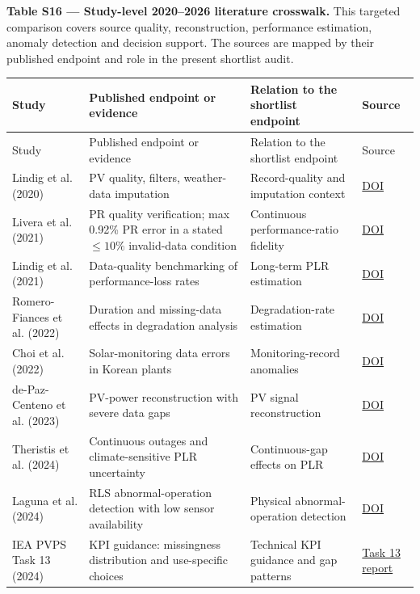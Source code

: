 \documentclass[11pt]{article}
\begin{document}
\medskip
\noindent\textbf{Table S16 --- Study-level 2020--2026 literature crosswalk.} This targeted comparison covers source quality, reconstruction, performance estimation, anomaly detection and decision support. The sources are mapped by their published endpoint and role in the present shortlist audit.
\begingroup
\scriptsize
\setlength{\tabcolsep}{3pt}
\renewcommand{\arraystretch}{1.14}
\begin{longtable}{L{2.75cm}L{4.6cm}L{6.3cm}L{1.2cm}}
\toprule
Study & Published endpoint or evidence & Relation to the shortlist endpoint & Source \\
\midrule
\endfirsthead
\toprule
Study & Published endpoint or evidence & Relation to the shortlist endpoint & Source \\
\midrule
\endhead
\bottomrule
\endfoot
Lindig et al. (2020) & PV quality, filters, weather-data imputation & Record-quality and imputation context & \href{https://doi.org/10.3390/en13195099}{DOI} \\
Livera et al. (2021) & PR quality verification; max 0.92\% PR error in a stated \ensuremath{\leq 10\%} invalid-data condition & Continuous performance-ratio fidelity & \href{https://doi.org/10.1002/pip.3349}{DOI} \\
Lindig et al. (2021) & Data-quality benchmarking of performance-loss rates & Long-term PLR estimation & \href{https://doi.org/10.1002/pip.3397}{DOI} \\
Romero-Fiances et al. (2022) & Duration and missing-data effects in degradation analysis & Degradation-rate estimation & \href{https://doi.org/10.1016/j.renene.2021.09.078}{DOI} \\
Choi et al. (2022) & Solar-monitoring data errors in Korean plants & Monitoring-record anomalies & \href{https://doi.org/10.1016/j.rser.2021.112007}{DOI} \\
de-Paz-Centeno et al. (2023) & PV-power reconstruction with severe data gaps & PV signal reconstruction & \href{https://doi.org/10.1016/j.eswa.2023.119510}{DOI} \\
Theristis et al. (2024) & Continuous outages and climate-sensitive PLR uncertainty & Continuous-gap effects on PLR & \href{https://doi.org/10.1002/solr.202300815}{DOI} \\
Laguna et al. (2024) & RLS abnormal-operation detection with low sensor availability & Physical abnormal-operation detection & \href{https://doi.org/10.1016/j.solener.2024.112556}{DOI} \\
IEA PVPS Task 13 (2024) & KPI guidance: missingness distribution and use-specific choices & Technical KPI guidance and gap patterns & \href{https://iea-pvps.org/wp-content/uploads/2024/12/IEA-PVPS-T13-28-2024-REPORT-Technical-and-Economic-KPIs.pdf}{Task 13 report} \\

\end{longtable}
\end{document}
